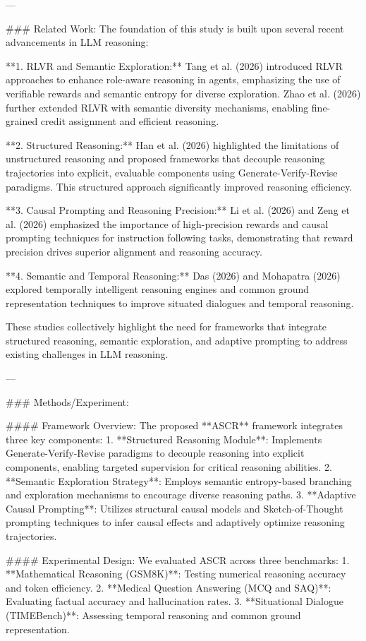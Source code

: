 ---

### Related Work:
The foundation of this study is built upon several recent advancements in LLM reasoning:

**1. RLVR and Semantic Exploration:** Tang et al. (2026) introduced RLVR approaches to enhance role-aware reasoning in agents, emphasizing the use of verifiable rewards and semantic entropy for diverse exploration. Zhao et al. (2026) further extended RLVR with semantic diversity mechanisms, enabling fine-grained credit assignment and efficient reasoning.

**2. Structured Reasoning:** Han et al. (2026) highlighted the limitations of unstructured reasoning and proposed frameworks that decouple reasoning trajectories into explicit, evaluable components using Generate-Verify-Revise paradigms. This structured approach significantly improved reasoning efficiency.

**3. Causal Prompting and Reasoning Precision:** Li et al. (2026) and Zeng et al. (2026) emphasized the importance of high-precision rewards and causal prompting techniques for instruction following tasks, demonstrating that reward precision drives superior alignment and reasoning accuracy.

**4. Semantic and Temporal Reasoning:** Das (2026) and Mohapatra (2026) explored temporally intelligent reasoning engines and common ground representation techniques to improve situated dialogues and temporal reasoning.

These studies collectively highlight the need for frameworks that integrate structured reasoning, semantic exploration, and adaptive prompting to address existing challenges in LLM reasoning.

---

### Methods/Experiment:

#### Framework Overview:
The proposed **ASCR** framework integrates three key components:
1. **Structured Reasoning Module**: Implements Generate-Verify-Revise paradigms to decouple reasoning into explicit components, enabling targeted supervision for critical reasoning abilities.
2. **Semantic Exploration Strategy**: Employs semantic entropy-based branching and exploration mechanisms to encourage diverse reasoning paths.
3. **Adaptive Causal Prompting**: Utilizes structural causal models and Sketch-of-Thought prompting techniques to infer causal effects and adaptively optimize reasoning trajectories.

#### Experimental Design:
We evaluated ASCR across three benchmarks:
1. **Mathematical Reasoning (GSM8K)**: Testing numerical reasoning accuracy and token efficiency.
2. **Medical Question Answering (MCQ and SAQ)**: Evaluating factual accuracy and hallucination rates.
3. **Situational Dialogue (TIMEBench)**: Assessing temporal reasoning and common ground representation.

